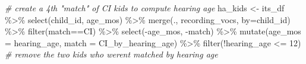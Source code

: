 \documentclass[
]{article}
\newenvironment{Shaded}{\begin{snugshade}}{\end{snugshade}}
\newcommand{\AttributeTok}[1]{\textcolor[rgb]{0.77,0.63,0.00}{#1}}
\newcommand{\CommentTok}[1]{\textcolor[rgb]{0.56,0.35,0.01}{\textit{#1}}}
\newcommand{\DecValTok}[1]{\textcolor[rgb]{0.00,0.00,0.81}{#1}}
\newcommand{\FunctionTok}[1]{\textcolor[rgb]{0.00,0.00,0.00}{#1}}
\newcommand{\NormalTok}[1]{#1}
\newcommand{\OtherTok}[1]{\textcolor[rgb]{0.56,0.35,0.01}{#1}}
\newcommand{\SpecialCharTok}[1]{\textcolor[rgb]{0.00,0.00,0.00}{#1}}
\newcommand{\StringTok}[1]{\textcolor[rgb]{0.31,0.60,0.02}{#1}}
\begin{document}
\begin{Shaded}
\begin{Highlighting}[]
\CommentTok{\# create a 4th "match" of CI kids to compute hearing age}
\NormalTok{ha\_kids }\OtherTok{\textless{}{-}}\NormalTok{ its\_df }\SpecialCharTok{\%\textgreater{}\%}
  \FunctionTok{select}\NormalTok{(child\_id, age\_mos) }\SpecialCharTok{\%\textgreater{}\%}
  \FunctionTok{merge}\NormalTok{(., recording\_vocs, }\AttributeTok{by=}\StringTok{\textquotesingle{}child\_id\textquotesingle{}}\NormalTok{) }\SpecialCharTok{\%\textgreater{}\%}
  \FunctionTok{filter}\NormalTok{(match}\SpecialCharTok{==}\StringTok{\textquotesingle{}CI\textquotesingle{}}\NormalTok{) }\SpecialCharTok{\%\textgreater{}\%}
  \FunctionTok{select}\NormalTok{(}\SpecialCharTok{{-}}\NormalTok{age\_mos, }\SpecialCharTok{{-}}\NormalTok{match) }\SpecialCharTok{\%\textgreater{}\%}
  \FunctionTok{mutate}\NormalTok{(}\AttributeTok{age\_mos =}\NormalTok{ hearing\_age,}
         \AttributeTok{match =} \StringTok{\textquotesingle{}CI\_by\_hearing\_age\textquotesingle{}}\NormalTok{) }\SpecialCharTok{\%\textgreater{}\%}
  \FunctionTok{filter}\NormalTok{(}\SpecialCharTok{!}\NormalTok{hearing\_age }\SpecialCharTok{\textless{}=} \DecValTok{12}\NormalTok{)  }\CommentTok{\# remove the two kids who weren\textquotesingle{}t matched by hearing age }



\end{Highlighting}
\end{Shaded}
\end{document}
